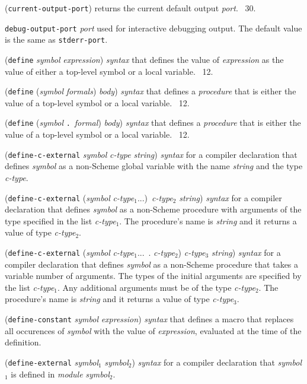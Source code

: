 \documentclass[10pt,twocolumn]{article}
\begin{document}
(\texttt{current-output-port}) returns the current default output
\emph{port}.  \RRRRRS~30.

\texttt{debug-output-port} \emph{port} used for interactive debugging
output.  The default value is the same as \texttt{stderr-port}.

(\texttt{define} \emph{symbol} \emph{expression}) \emph{syntax} that
defines the value of \emph{expression} as the value of either a
top-level symbol or a local variable.  \RRRRRS~12.

(\texttt{define} (\emph{symbol} \emph{formals}) \emph{body})
\emph{syntax} that defines a \emph{procedure} that is either the value
of a top-level symbol or a local variable. \RRRRRS~12.

(\texttt{define} (\emph{symbol} \texttt{.}\ \emph{formal})
\emph{body}) \emph{syntax} that defines a \emph{procedure} that is
either the value of a top-level symbol or a local
variable. \RRRRRS~12.

(\texttt{define-c-external} \emph{symbol} \emph{c-type} \emph{string})
\emph{syntax} for a compiler declaration that defines \emph{symbol} as
a non-Scheme global variable with the name \emph{string} and the type
\emph{c-type}.

(\texttt{define-c-external} (\emph{symbol}
\emph{c-type}$_1$...)\ \emph{c-type}$_2$ \emph{string}) \emph{syntax}
for a compiler declaration that defines \emph{symbol} as a non-Scheme
procedure with arguments of the type specified in the list
\emph{c-type}$_1$.  The procedure's name is \emph{string} and it
returns a value of type \emph{c-type}$_2$.

(\texttt{define-c-external} (\emph{symbol} \emph{c-type}$_1$...\ .
\emph{c-type}$_2$) \emph{c-type}$_3$ \emph{string}) \emph{syntax} for
a compiler declaration that defines \emph{symbol} as a non-Scheme
procedure that takes a variable number of arguments.  The types of the
initial arguments are specified by the list \emph{c-type}$_1$.  Any
additional arguments must be of the type \emph{c-type}$_2$.  The
procedure's name is \emph{string} and it returns a value of type
\emph{c-type}$_3$.

(\texttt{define-constant} \emph{symbol} \emph{expression})
\emph{syntax} that defines a macro that replaces all occurences of
\emph{symbol} with the value of \emph{expression}, evaluated at the
time of the definition.

(\texttt{define-external} \emph{symbol}$_1$ \emph{symbol}$_2$)
\emph{syntax} for a compiler declaration that \emph{symbol}$_1$ is
defined in \emph{module} \emph{symbol}$_2$.
\end{document}
